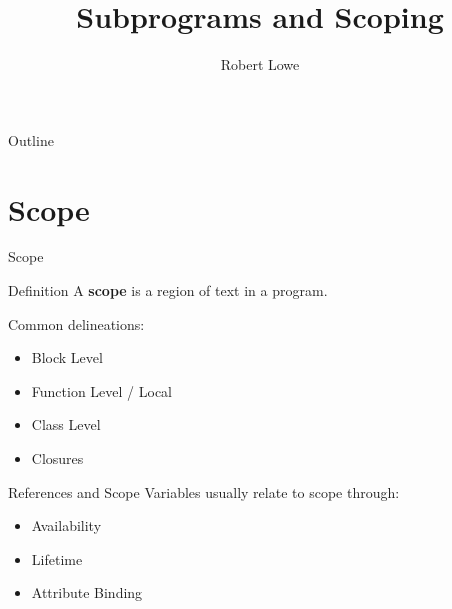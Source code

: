 \documentclass[handout]{beamer}
\title{Subprograms and Scoping}
\author{Robert Lowe}
\institute[Southeast Missouri State University] %
{
  Department of Computer Science\\
  Southeast Missouri State University
}
\date[]{}
\begin{document}
\begin{frame}
  \titlepage
\end{frame}

\begin{frame}{Outline}
  \tableofcontents
\end{frame}





\section{Scope}
\begin{frame}{Scope}
   \begin{block}{Definition}
   A \textbf{scope} is a region of text in a program.
   \end{block} 
   
   Common delineations:
   \begin{itemize}
       \item Block Level
       \item Function Level / Local
       \item Class Level
       \item Closures
   \end{itemize}
\end{frame}

\begin{frame}{References and Scope}
    Variables usually relate to scope through:
    \begin{itemize}
        \item Availability
        \item Lifetime
        \item Attribute Binding
    \end{itemize}
\end{frame}
\end{document}
